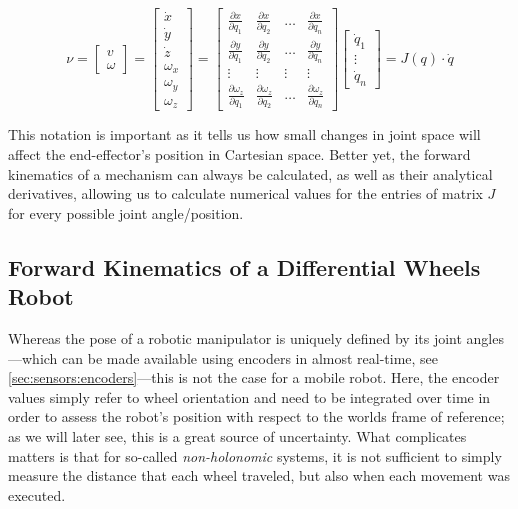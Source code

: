 \begin{equation}\label{eq:kinematics:diff:fwd}
\nu = \left[\begin{array}{c}v\\\omega\end{array}\right]=
\left[\begin{array}{c}\dot{x}\\
\dot{y}\\
\dot{z}\\
\omega_x\\
\omega_y\\
\omega_z\end{array}\right]=
\left[\begin{array}{cccc}\frac{\partial{x}}{\partial{q_1}} & \frac{\partial{x}}{\partial{q_2}} & \ldots & \frac{\partial{x}}{\partial{q_n}}\\\frac{\partial{y}}{\partial{q_1}} & \frac{\partial{y}}{\partial{q_2}} & \ldots & \frac{\partial{y}}{\partial{q_n}}\\\vdots & \vdots & \vdots & \vdots\\\frac{\partial{\omega_z}}{\partial{q_1}} & \frac{\partial{\omega_z}}{\partial{q_2}} & \ldots & \frac{\partial{\omega_z}}{\partial{q_n}}\end{array}\right]\left[\begin{array}{c}\dot{q}_1\\\vdots\\\dot{q}_n\end{array}\right] = J (q) \cdot \dot{q}
\end{equation}

This notation is important as it tells us how small changes in joint space will affect the end-effector's position in Cartesian space. Better yet, the forward kinematics of a mechanism can always be calculated, as well as their analytical derivatives, allowing us to calculate numerical values for the entries of matrix $J$ for every possible joint angle/position.

\subsection{Forward Kinematics of a Differential Wheels Robot}\label{sec:kinematics:fwk:mobile}

Whereas the pose of a robotic manipulator is uniquely defined by its joint angles---which can be made available using encoders in almost real-time, see \cref{sec:sensors:encoders}---this is not the case for a mobile robot.
Here, the encoder values simply refer to wheel orientation and need to be integrated over time in order to assess the robot's position with respect to the worlds frame of reference; as we will later see, this is a great source of uncertainty.
What complicates matters is that for so-called \textsl{non-holonomic} systems, it is not sufficient to simply measure the distance that each wheel traveled, but also when each movement was executed.

